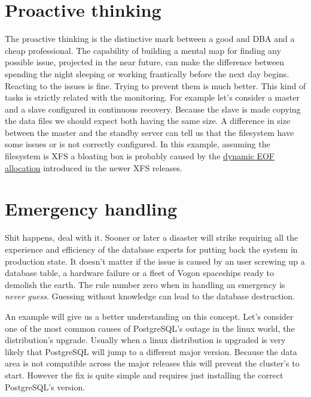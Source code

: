 \section{Proactive thinking}
The proactive thinking is the distinctive mark between a good and DBA and a cheap professional. The 
capability of building a mental map for finding any possible issue, projected in the near future, can 
make the difference between spending the night sleeping or working frantically before the next day begins. 
Reacting to the issues is fine. Trying to prevent them is much better. This kind of tasks is strictly 
related with the monitoring. For example let's consider a master and a slave configured in continuous 
recovery. Because the slave is made copying the data files we should expect both having the same size. 
A difference in size between the master and the standby server can tell us that the filesystem have some 
issues or is not correctly configured. In this example, assuming the filesystem is XFS a bloating box is 
probably caused by the \href{
http://serverfault.com/questions/406069/why-are-my-xfs-filesystems-suddenly-consuming-more-space-and-full-of
-sparse-file}{dynamic EOF allocation} introduced in the newer XFS releases.

\section{Emergency handling}
\label{sec:DBAEMERGENCY}
Shit happens, deal with it. Sooner or later a disaster will strike requiring all the experience and 
efficiency of the database experts for putting back the system in production state. It doesn't matter if 
the issue is caused by an user screwing up a database table, a hardware failure or a fleet of Vogon 
spaceships ready to demolish the earth. The rule number zero when in handling an emergency is \textit{never 
guess}. Guessing without knowledge can lead to the database destruction.\newline

An example will give us a better understanding on this concept. Let's consider one of the most common 
causes of PostgreSQL's outage in the linux world, the distribution's upgrade. Usually when a linux 
distribution is upgraded is very likely that PostgreSQL will jump to a different major version. 
Because the data area is not compatible across the major releases this will prevent the cluster's to start. 
However the fix is quite simple and requires just installing the correct PostgreSQL's version.\newline

